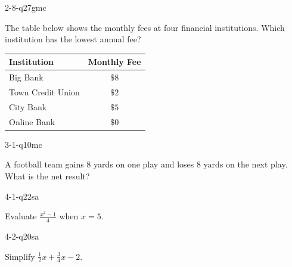 \documentclass[12pt, fleqn, openany]{studyGuide}
\begin{document}
\begin{practiceQuestion}{2-8-q27}{gmc}
\begin{questionText}
The table below shows the monthly fees at four financial institutions. Which institution has the lowest annual fee?

\begin{center}
\begin{tabular}{|l|c|}
\hline
\textbf{Institution} & \textbf{Monthly Fee} \\
\hline
Big Bank & $\$8$ \\
\hline
Town Credit Union & $\$2$ \\
\hline
City Bank & $\$5$ \\
\hline
Online Bank & $\$0$ \\
\hline
\end{tabular}
\end{center}
\end{questionText}
\end{practiceQuestion}

\begin{practiceQuestion}{3-1-q10}{mc}
\begin{questionText}
A football team gains $8$ yards on one play and loses $8$ yards on the next play. What is the net result?
\end{questionText}
\end{practiceQuestion}

\begin{practiceQuestion}{4-1-q22}{sa}
\begin{questionText}
Evaluate $\frac{x^2 - 1}{4}$ when $x = 5$.
\end{questionText}
\end{practiceQuestion}

\begin{practiceQuestion}{4-2-q20}{sa}
\begin{questionText}
Simplify $\frac{1}{2}x + \frac{3}{4}x - 2$.


\begin{center}
\hspace{1cm}
\end{center}
\end{questionText}
\end{practiceQuestion}



\printAnswerKey


\end{document}

